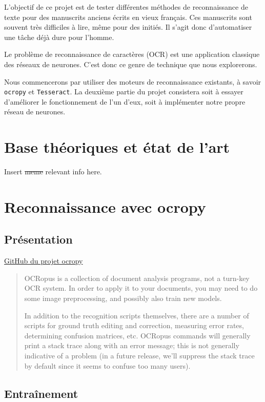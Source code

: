 \documentclass{article}
\begin{document}
L'objectif de ce projet est de tester différentes méthodes de reconnaissance de texte pour des manuscrits anciens écrits en vieux français. Ces manuscrits sont souvent très difficiles à lire, même pour des initiés. Il s'agit donc d'automatiser une tâche déjà dure pour l'homme.

Le problème de reconnaissance de caractères (OCR) est une application classique des réseaux de neurones. C'est donc ce genre de technique que nous explorerons.

Nous commencerons par utiliser des moteurs de reconnaissance existants, à savoir \texttt{ocropy} et \texttt{Tesseract}. La deuxième partie du projet consistera soit à essayer d'améliorer le fonctionnement de l'un d'eux, soit à implémenter notre propre réseau de neurones. 


\section{Base théoriques et état de l'art}

Insert \sout{meme} relevant info here.


\section{Reconnaissance avec ocropy}

\subsection{Présentation}

\href{https://github.com/tmbdev/ocropy}{GitHub du projet ocropy}

\begin{quotation}
    OCRopus is a collection of document analysis programs, not a turn-key OCR system. In order to apply it to your documents, you may need to do some image preprocessing, and possibly also train new models.

    In addition to the recognition scripts themselves, there are a number of scripts for ground truth editing and correction, measuring error rates, determining confusion matrices, etc. OCRopus commands will generally print a stack trace along with an error message; this is not generally indicative of a problem (in a future release, we'll suppress the stack trace by default since it seems to confuse too many users).
\end{quotation}

\subsection{Entraînement}
\end{document}
